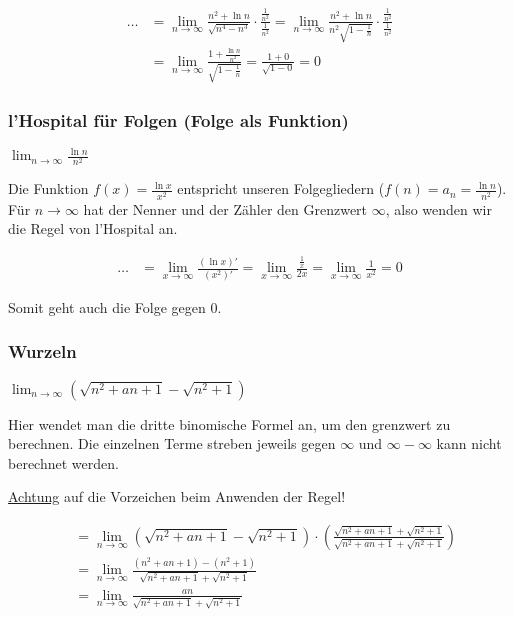 \begin{align*}
	\ldots &= \lim_{n \to \infty} \frac{n^2 + \ln n}{\sqrt{n^4 - n^3}}
	\cdot \frac{\frac{1}{n^2}}{\frac{1}{n^2}} = \lim_{n \to \infty} \frac{n^2 + \ln
		n}{n^2 \sqrt{1 - \frac{1}{n}}} \cdot \frac{\frac{1}{n^2}}{\frac{1}{n^2}} \\
	&= \lim_{n \to \infty} \frac{1 + \frac{\ln n}{n^2}}{\sqrt{1 - \frac{1}{n}}}
	= \frac{1 + 0}{\sqrt{1 - 0}} = 0
\end{align*}

\subsubsection{l'Hospital für Folgen (Folge als Funktion)}
$\lim_{n \to \infty} \frac{\ln n}{n^2}$

Die Funktion $f(x) = \frac{\ln x}{x^2}$ entspricht unseren Folgegliedern ($f(n)
= a_n = \frac{\ln n}{n^2}$). Für $n \to \infty$ hat der Nenner und der Zähler
den Grenzwert $\infty$, also wenden wir die Regel von l'Hospital an.

\begin{align*}
	\ldots &= \lim_{x \to \infty} \frac{(\ln x)'}{(x^2)'} = \lim_{x \to \infty}
	\frac{\frac{1}{x}}{2x} = \lim_{x \to \infty} \frac{1}{x^2} = 0
\end{align*}

Somit geht auch die Folge gegen 0.

\subsubsection{Wurzeln}
$\lim_{n \to \infty} (\sqrt{n^2 + an + 1} - \sqrt{n^2 + 1})$

Hier wendet man die dritte binomische Formel an, um den grenzwert zu berechnen.
Die einzelnen Terme streben jeweils gegen $\infty$ und $\infty - \infty$ kann
nicht berechnet werden.

\underline{Achtung} auf die Vorzeichen beim Anwenden der Regel!

\begin{align*}
	&= \lim_{n \to \infty} (\sqrt{n^2 + an + 1} - \sqrt{n^2 + 1}) \cdot
	\left(\frac{\sqrt{n^2 + an + 1} + \sqrt{n^2 + 1}}{\sqrt{n^2 + an + 1} +
		\sqrt{n^2 + 1}} \right) \\
	&= \lim_{n \to \infty} \frac{(n^2 + an + 1) - (n^2 + 1)}{\sqrt{n^2 + an + 1} +
		\sqrt{n^2 + 1}} \\
	&= \lim_{n \to \infty} \frac{an}{\sqrt{n^2 + an + 1} + \sqrt{n^2 + 1}} 
\end{align*}

